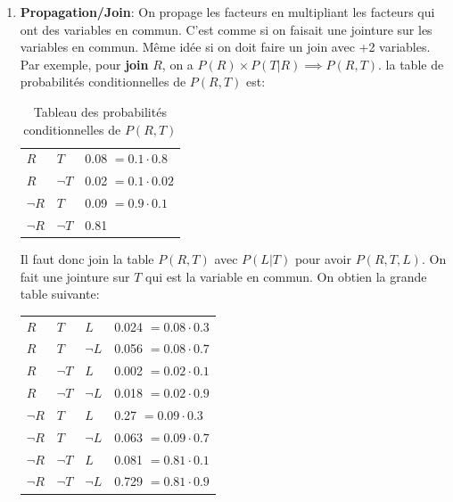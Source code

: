 \begin{enumerate}
    \item \textbf{Propagation/Join}: On propage les facteurs en multipliant les facteurs qui ont des variables en commun. C'est comme si on faisait une jointure sur les variables en commun. Même idée si on doit faire un join avec +2 variables.
        Par exemple, pour \textbf{join} $R$, on a $P(R) \times P(T | R) \implies P(R, T)$.
        la table de probabilités conditionnelles de $P(R, T)$ est: 
        \begin{table}[H]
            \centering
            \begin{tabular}{|l|l|l|}
                \hline
                $R$ & $T$ & 0.08 $= 0.1 \cdot 0.8$ \\ 
                $R$ & $\neg T$ & 0.02 $= 0.1 \cdot 0.02$\\
                $\neg R$ & $T$ & 0.09 $= 0.9 \cdot 0.1$\\
                $\neg R$ & $\neg T$ & 0.81 \\
                \hline
            \end{tabular}
            \caption{Tableau des probabilités conditionnelles de $P(R, T)$}
            \label{tab:rt}
        \end{table}
        Il faut donc join la table $P(R, T)$ avec $P(L | T)$ pour avoir $P(R, T, L)$. On fait une jointure sur $T$ qui est la variable en commun.
        On obtien la grande table suivante: 
        \begin{table}[H]
            \centering
            \begin{tabular}{|l|l|l|l|}
                \hline
                $R$ & $T$ & $L$ & 0.024 $= 0.08 \cdot 0.3$ \\ 
                $R$ & $T$ & $\neg L$ & 0.056 $= 0.08 \cdot 0.7$\\
                $R$ & $\neg T$ & $L$ & 0.002 $= 0.02 \cdot 0.1$\\
                $R$ & $\neg T$ & $\neg L$ & 0.018 $= 0.02 \cdot 0.9$\\
                $\neg R$ & $T$ & $L$ & 0.27 $= 0.09 \cdot 0.3$\\
                $\neg R$ & $T$ & $\neg L$ & 0.063 $= 0.09 \cdot 0.7$\\
                $\neg R$ & $\neg T$ & $L$ & 0.081 $= 0.81 \cdot 0.1$\\
                $\neg R$ & $\neg T$ & $\neg L$ & 0.729 $= 0.81 \cdot 0.9$\\
                \hline
            \end{tabular}

\end{table}
\end{enumerate}
